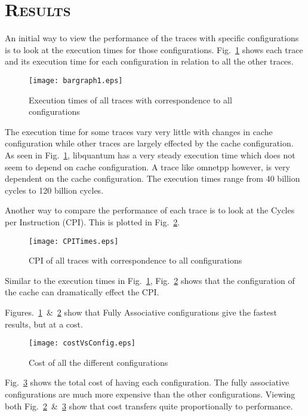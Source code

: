 \documentclass[FinalReport.tex]{subfiles}
\begin{document}
\section*{\textsc{\Large Results}}

An initial way to view the performance of the traces with specific configurations is to look at the execution times for those configurations.  Fig.~\ref{fig:executiontimes} shows each trace and its execution time for each configuration in relation to all the other traces.
\begin{figure}[H]
\centering
\texttt{[image: bargraph1.eps]}
\caption{Execution times of all traces with correspondence to all configurations\label{fig:executiontimes}}
\end{figure}
The execution time for some traces vary very little with changes in cache configuration while other traces are largely effected by the cache configuration.  As seen in Fig.~\ref{fig:executiontimes}, {libquantum} has a very steady execution time which does not seem to depend on cache configuration.  A trace like {omnetpp} however, is very dependent on the cache configuration.  The execution times range from 40 billion cycles to 120 billion cycles. 

Another way to compare the performance of each trace is to look at the Cycles per Instruction (CPI).  This is plotted in Fig.~\ref{fig:CPI}.
\begin{figure}[H]
\centering
\texttt{[image: CPITimes.eps]}
\caption{CPI of all traces with correspondence to all configurations\label{fig:CPI}}
\end{figure}

Similar to the execution times in Fig.~\ref{fig:executiontimes}, Fig.~\ref{fig:CPI} shows that the configuration of the cache can dramatically effect the CPI. 

Figures.~\ref{fig:executiontimes}~\&~\ref{fig:CPI} show that Fully Associative configurations give the fastest results, but at a cost.
\begin{figure}[H]
\centering
\texttt{[image: costVsConfig.eps]}
\caption{Cost of all the different configurations\label{fig:costVsConfig}}
\end{figure}
Fig.~\ref{fig:costVsConfig} shows the total cost of having each configuration.  The fully associative configurations are much more expensive than the other configurations.  Viewing both Fig.~\ref{fig:CPI}~\&~\ref{fig:costVsConfig} show that cost transfers quite proportionally to performance.  





\end{document}
